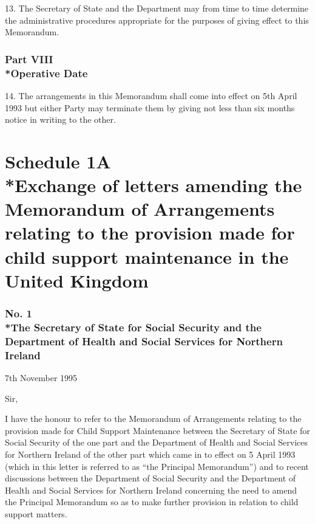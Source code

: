 \documentclass[12pt,a4paper]{article}
\begin{document}
\renewcommand\parthead{--- Schedule 1 Part VII}

13.   The Secretary of State and the Department may from time to time determine the administrative procedures appropriate for the purposes of giving effect to this Memorandum.

\section[Part VIII --- Operative Date]{Part VIII\\*Operative Date}

\renewcommand\parthead{--- Schedule 1 Part VIII}

14.   The arrangements in this Memorandum shall come into effect on 5th April 1993 but either Party may terminate them by giving not less than six months notice in writing to the other.

\vfill

\part[Schedule 1A --- Exchange of letters amending the Memorandum of Arrangements relating to the provision made for child support maintenance in the United Kingdom]{Schedule 1A\\*Exchange of letters amending the Memorandum of Arrangements relating to the provision made for child support maintenance in the United Kingdom}

\renewcommand\parthead{--- Schedule 1A}


\section*{No. 1\\*The Secretary of State for Social Security and the Department of Health and Social Services for Northern Ireland}

7th November 1995

  Sir,

  I have the honour to refer to the Memorandum of Arrangements relating to the provision made for Child Support Maintenance between the Secretary of State for Social Security of the one part and the Department of Health and Social Services for Northern Ireland of the other part which came in to effect on 5 April 1993 (which in this letter is referred to as “the Principal Memorandum”) and to recent discussions between the Department of Social Security and the Department of Health and Social Services for Northern Ireland concerning the need to amend the Principal Memorandum so as to make further provision in relation to child support matters.
\end{document}
